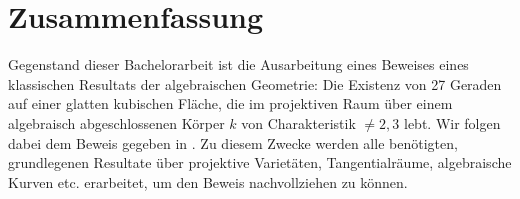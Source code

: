\documentclass[12pt,a4paper,twoside]{article}
\begin{document}
\pagestyle{empty}


\section*{Zusammenfassung}

Gegenstand dieser Bachelorarbeit ist die Ausarbeitung eines Beweises eines klassischen Resultats der algebraischen Geometrie: Die Existenz von 27 Geraden auf einer glatten ku\-bi\-schen Fläche, die im projektiven Raum über einem algebraisch abgeschlossenen Körper $k$ von Charakteristik $\neq 2,3$ lebt.
Wir folgen dabei dem Beweis gegeben in \cite{reid1988undergraduate}.
Zu diesem Zwecke werden alle benötigten, grundlegenen Resultate über projektive Varietäten, Tangentialräume, algebraische Kurven etc. erarbeitet, um den Beweis nachvollziehen zu können.

\newpage
\tableofcontents

\newpage

\pagestyle{headings}


















\end{document}
